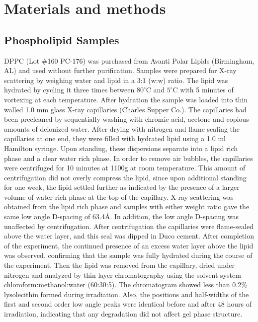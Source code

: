 \section{Materials and methods}
\label{gel_model_matmet}

\subsection*{Phospholipid Samples}

DPPC (Lot \#160 PC-176) was purchased from Avanti Polar Lipids (Birmingham, AL) and used
without further purification.  Samples were prepared for X-ray scattering
by weighing water and lipid in a 3:1 (w:w) ratio.
The lipid was hydrated by cycling it
three times between $80^{\circ}$C and $5^{\circ}$C with 5 minutes of vortexing at
each temperature.  After hydration the sample was loaded into thin walled
1.0 mm glass X-ray capillaries (Charles Supper Co.).  The capillaries
had been precleaned by sequentially washing with chromic acid, 
acetone and copious amounts of deionized water.
After drying with nitrogen and flame sealing the capillaries
at one end, they were filled with hydrated lipid using a
1.0 ml Hamilton syringe.  Upon standing, these dispersions separate
into a lipid rich phase and a clear water rich phase.  
In order to remove air bubbles, the capillaries
were centrifuged for 10 minutes at 1100g at room temperature.
This amount of centrifugation did not overly compress the lipid, 
since upon additional standing for one week, the lipid settled 
further as indicated by the presence of a larger volume of water rich phase at
the top of the capillary.  X-ray scattering was obtained from the
lipid rich phase and samples with either weight
ratio gave the same low angle D-spacing of 63.4\AA .
In addition, the low angle D-spacing was unaffected by centrifugation.
After centrifugation the capillaries were flame-sealed above the water 
layer, and this seal was dipped in Duco cement.  
After completion of the experiment, the continued presence of an excess
water layer above the lipid was observed, confirming that the sample was
fully hydrated during the course of the experiment.  Then
the lipid was removed from the capillary, dried under nitrogen and
analyzed by thin layer chromatography using the solvent system
chloroform:methanol:water (60:30:5).   The chromatogram showed less than
0.2\% lysolecithin formed during irradiation.  Also, the positions and half-widths 
of the first and second order low angle peaks were identical before and after
48 hours of irradiation, indicating that any degradation did not affect
gel phase structure.

